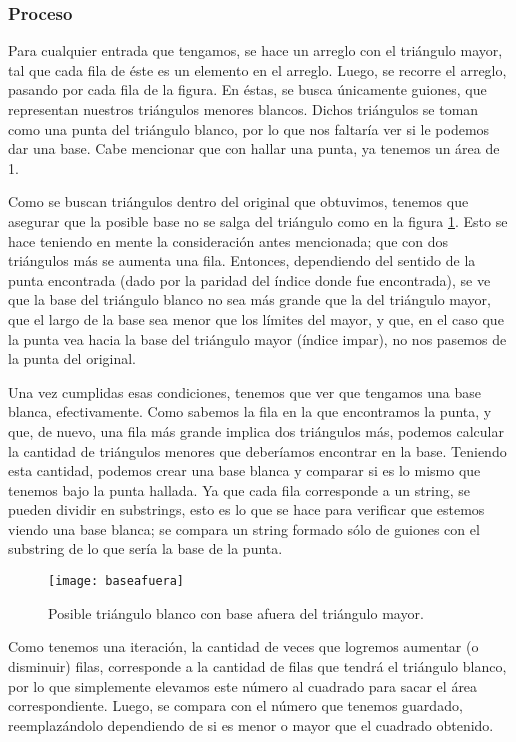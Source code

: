 \documentclass[letterpaper]{article}
\begin{document}
\subsubsection{Proceso}
Para cualquier entrada que tengamos, se hace un arreglo con el tri\'angulo mayor,
tal que cada fila de \'este es un elemento en el arreglo. Luego, se recorre el
arreglo, pasando por cada fila de la figura. En \'estas, se busca \'unicamente guiones,
que representan nuestros tri\'angulos menores blancos. Dichos tri\'angulos se toman
como una punta del tri\'angulo blanco, por lo que nos faltar\'ia ver si le podemos
dar una base. Cabe mencionar que con hallar una punta, ya tenemos un \'area de 1.\par
Como se buscan tri\'angulos dentro del original que obtuvimos, tenemos que asegurar
que la posible base no se salga del tri\'angulo como en la figura \ref{fig:baseafuera}.
Esto se hace teniendo en mente la consideraci\'on antes mencionada; que con dos
tri\'angulos m\'as se aumenta una fila. Entonces, dependiendo del sentido de la
punta encontrada (dado por la paridad del \'indice donde fue encontrada), se ve
que la base del tri\'angulo blanco no sea m\'as grande que la del tri\'angulo
mayor, que el largo de la base sea menor que los l\'imites del mayor, y que, en
el caso que la punta vea hacia la base del tri\'angulo mayor (\'indice impar), no
nos pasemos de la punta del original.\par
Una vez cumplidas esas condiciones, tenemos que ver que tengamos una base blanca,
efectivamente. Como sabemos la fila en la que encontramos la punta, y que, de nuevo,
una fila m\'as grande implica dos tri\'angulos m\'as, podemos calcular la cantidad
de tri\'angulos menores que deber\'iamos encontrar en la base. Teniendo esta
cantidad, podemos crear una base blanca y comparar si es lo mismo que tenemos bajo
la punta hallada. Ya que cada fila corresponde a un string, se pueden dividir en
substrings, esto es lo que se hace para verificar que estemos viendo una base
blanca; se compara un string formado s\'olo de guiones con el substring de lo que
ser\'ia la base de la punta.
  \begin{figure}[t!]
    \centering
    \texttt{[image: baseafuera]}
    \caption{Posible tri\'angulo blanco con base afuera del tri\'angulo mayor.}
    \label{fig:baseafuera}
  \end{figure}
  \par Como tenemos una iteraci\'on, la cantidad de veces que logremos aumentar
  (o disminuir) filas, corresponde a la cantidad de filas que tendr\'a el
  tri\'angulo blanco, por lo que simplemente elevamos este n\'umero al cuadrado
  para sacar el \'area correspondiente. Luego, se compara con el n\'umero que
  tenemos guardado, reemplaz\'andolo dependiendo de si es menor o mayor que el
  cuadrado obtenido.
  \newpage
\end{document}
